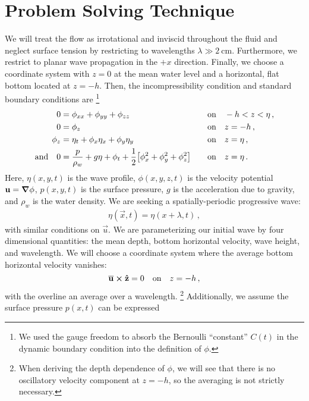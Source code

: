\documentclass{jfm}
\let\Oldsection\section
\renewcommand{\section}{\FloatBarrier\Oldsection}
\begin{document}
\section{Problem Solving Technique}
We will treat the flow as irrotational and inviscid throughout the
fluid and neglect surface tension by restricting to wavelengths $\lambda
\gg \SI{2}{\centi\meter}$.
Furthermore, we restrict to planar wave propagation in the $+x$
direction.
Finally, we choose a coordinate system with $z=0$ at the mean water level and
a horizontal, flat bottom located at $z=-h$.
Then, the incompressibility condition and standard boundary conditions
are%
\footnote{
  We used the gauge freedom to absorb the Bernoulli ``constant'' $C(t)$
  in the dynamic boundary condition into the definition of $\phi$.
}
\begin{alignat}{2}
  0 &= \phi_{xx} + \phi_{yy} + \phi_{zz} &&\qq{on}
  -h < z < \eta \,, \label{eq:laplace}\\
  0 &= \phi_{z} &&\qq{on} z=-h \,, \label{eq:bottom_bc}\\
  \phi_{z} &= \eta_{t} + \phi_{x} \eta_{x} +
  \phi_{y} \eta_{y} &&\qq{on} z = \eta \,, \label{eq:kinematic_bc}\\
  \qq*{and} 0 &= \frac{p}{\rho_w} + g\eta + \phi_{t} +
  \frac{1}{2} \bqty{\phi_{x}^2 + \phi_{y}^2 + \phi_{z}^2} &&\qq{on} z=
  \eta \,. \label{eq:dynamic_bc}
\end{alignat}
Here, $\eta(x,y,t)$ is the wave profile, $\phi(x,y,z,t)$ is the velocity
potential $\mathbf{\bm{u}} = \grad{\phi}$, $p(x,y,t)$ is the surface pressure,
$g$ is the acceleration due to gravity, and $\rho_w$ is the water
density.
We are seeking a spatially-periodic progressive wave:
\begin{gather}
  \eta(\vec{x},t) = \eta(x + \lambda, t) \,,
\end{gather}
with similar conditions on $\vec{u}$.
We are parameterizing our initial wave by four dimensional quantities:
the mean depth, bottom horizontal velocity, wave height, and wavelength.
We will choose a coordinate system where the average bottom horizontal
velocity vanishes:
\begin{equation}
  \overline{\vec{u}} \cross \vu{z} = 0 \qq{on} z=-h \,,
  \label{eq:bot_bc_horz}
\end{equation}
with the overline an average over a wavelength.%
\footnote{
  When deriving the depth dependence of $\phi$, we will see that there
  is no oscillatory velocity component at $z=-h$, so the averaging is
  not strictly necessary.
}
Additionally, we assume the surface pressure $p(x,t)$ can be expressed
\end{document}
